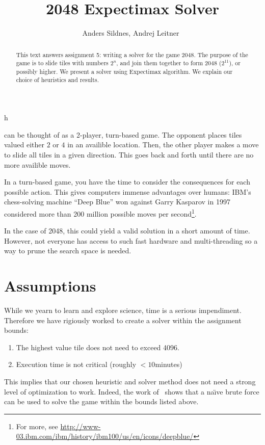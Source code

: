 \documentclass[journal]{IEEEtran}
\def\naive{na\"{\i}ve}
\begin{document}
%
\title{2048 Expectimax Solver}

\author{Anders Sildnes, Andrej Leitner~%
}%

%
{h}

\maketitle

\begin{abstract}
    This text answers assignment 5: writing a solver for the game 2048.
    The purpose of the game is to slide tiles with numbers $2^{n}$, and join them
    together to form 2048 ($2^{11}$), or possibly higher. 
    We present a solver using Expectimax algorithm. We explain our choice of
    heuristics and results.
\end{abstract}

 can be thought of as a 2-player, turn-based game. The
opponent places tiles valued either $2$ or $4$ in an availible location. Then,
the other player makes a move to slide all tiles in a given direction. This
goes back and forth until there are no more availible moves. 

In a turn-based game, you have the time to consider the consequences for each possible
action. This gives computers immense advantages over humans:
IBM's chess-solving machine ``Deep Blue'' won against Garry Kasparov in 1997 considered more than
200 million possible moves per second\footnote{For more, see
    \href{http://www-03.ibm.com/ibm/history/ibm100/us/en/icons/deepblue/}
{http://www-03.ibm.com/ibm/history/ibm100/us/en/icons/deepblue/}}.

In the case of 2048, this could yield a valid solution in a short amount of
time. However, not everyone has access to such fast hardware and
multi-threading so a way to prune the search space is needed.

\section*{Assumptions}
While we yearn to learn and explore science, time is a serious impendiment.
Therefore we have rigiously worked to create a solver within the assignment bounds:
\begin{enumerate}
    \item The highest value tile does not need to exceed 4096.
    \item Execution time is not critical (roughly $< 10$minutes)
\end{enumerate}
This implies that our chosen heuristic and solver method does not need a strong
level of optimization to work. Indeed, the work of~\cite{brutesolver} shows that
a \naive{} brute force can be used to solve the game within the bounds listed above.
\end{document}
